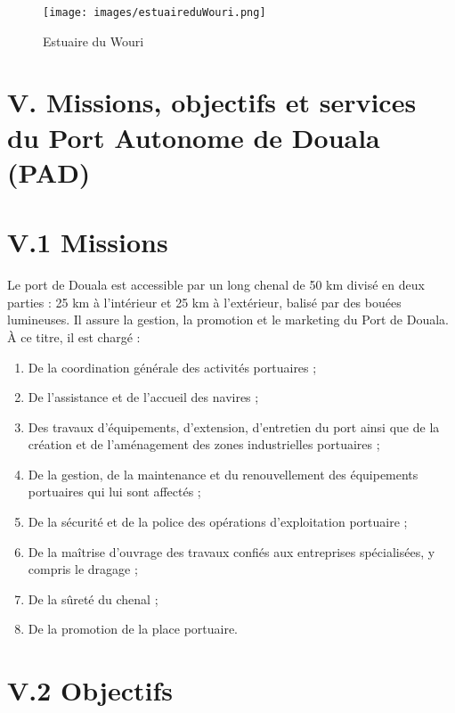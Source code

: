 \documentclass[a4paper,12pt,openany]{report}
\begin{document}
	
	\begin{figure}[H]
		\centering
		\texttt{[image: images/estuaireduWouri.png]}
		\caption{Estuaire du Wouri\label{Fig 1}}
	\end{figure}
	
	
	
	
	\section*{V. Missions, objectifs et services du Port Autonome de Douala (PAD)}
	
	\section*{V.1 Missions}
	
	Le port de Douala est accessible par un long chenal de 50 km divisé en deux parties : 25 km à l’intérieur et 25 km à l’extérieur, balisé par des bouées lumineuses. Il assure la gestion, la promotion et le marketing du Port de Douala. À ce titre, il est chargé :
	
	\begin{enumerate}
		\item De la coordination générale des activités portuaires ;
		\item De l’assistance et de l’accueil des navires ;
		\item Des travaux d’équipements, d’extension, d’entretien du port ainsi que de la création et de l’aménagement des zones industrielles portuaires ;
		\item De la gestion, de la maintenance et du renouvellement des équipements portuaires qui lui sont affectés ;
		\item De la sécurité et de la police des opérations d’exploitation portuaire ;
		\item De la maîtrise d’ouvrage des travaux confiés aux entreprises spécialisées, y compris le dragage ;
		\item De la sûreté du chenal ;
		\item De la promotion de la place portuaire.
	\end{enumerate}
	
	\section*{V.2 Objectifs}
	
\end{document}
